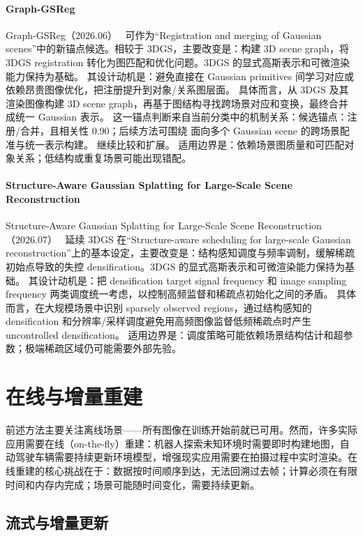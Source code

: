 \paragraph{Graph-GSReg}
Graph-GSReg（2026.06）~\cite{2606_29782} 可作为“Registration and merging of Gaussian scenes”中的新锚点候选。相较于 3DGS，主要改变是：构建 3D scene graph，将 3DGS registration 转化为图匹配和优化问题。3DGS 的显式高斯表示和可微渲染能力保持为基础。
其设计动机是：避免直接在 Gaussian primitives 间学习对应或依赖昂贵图像优化，把注册提升到对象/关系图层面。
具体而言，从 3DGS 及其渲染图像构建 3D scene graph，再基于图结构寻找跨场景对应和变换，最终合并成统一 Gaussian 表示。
这一锚点判断来自当前分类中的机制关系：候选锚点：注册/合并，且相关性 0.90；后续方法可围绕 面向多个 Gaussian scene 的跨场景配准与统一表示构建。 继续比较和扩展。
适用边界是：依赖场景图质量和可匹配对象关系；低结构或重复场景可能出现错配。

\paragraph{Structure-Aware Gaussian Splatting for Large-Scale Scene Reconstruction}
Structure-Aware Gaussian Splatting for Large-Scale Scene Reconstruction（2026.07）~\cite{2607_01698} 延续 3DGS 在“Structure-aware scheduling for large-scale Gaussian reconstruction”上的基本设定，主要改变是：结构感知调度与频率调制，缓解稀疏初始点导致的失控 densification。3DGS 的显式高斯表示和可微渲染能力保持为基础。
其设计动机是：把 densification target signal frequency 和 image sampling frequency 两类调度统一考虑，以控制高频监督和稀疏点初始化之间的矛盾。
具体而言，在大规模场景中识别 sparsely observed regions，通过结构感知的 densification 和分辨率/采样调度避免用高频图像监督低频稀疏点时产生 uncontrolled densification。
适用边界是：调度策略可能依赖场景结构估计和超参数；极端稀疏区域仍可能需要外部先验。
\section{在线与增量重建}
\label{sec:14_2}

前述方法主要关注离线场景——所有图像在训练开始前就已可用。然而，许多实际应用需要在线（on-the-fly）重建：机器人探索未知环境时需要即时构建地图，自动驾驶车辆需要持续更新环境模型，增强现实应用需要在拍摄过程中实时渲染。在线重建的核心挑战在于：数据按时间顺序到达，无法回溯过去帧；计算必须在有限时间和内存内完成；场景可能随时间变化，需要持续更新。

\subsection{流式与增量更新}
\label{ss:14_4}

